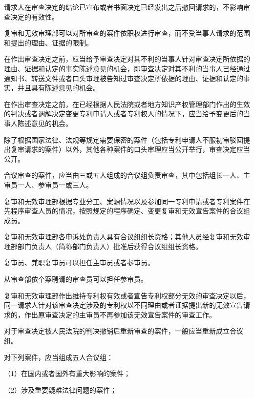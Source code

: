 请求人在审查决定的结论已宣布或者书面决定已经发出之后撤回请求的，不影响审查决定的有效性。

复审和无效审理部可以对所审查的案件依职权进行审查，而不受当事人请求的范围和提出的理由、证据的限制。

在作出审查决定之前，应当给予审查决定对其不利的当事人针对审查决定所依据的理由、证据和认定的事实陈述意见的机会，即审查决定对其不利的当事人已经通过通知书、转送文件或者口头审理被告知过审查决定所依据的理由、证据和认定的事实，并且具有陈述意见的机会。

在作出审查决定之前，在已经根据人民法院或者地方知识产权管理部门作出的生效的判决或者调解决定变更专利申请人或者专利权人的情况下，应当给予变更后的当事人陈述意见的机会。

除了根据国家法律、法规等规定需要保密的案件（包括专利申请人不服初审驳回提出复审请求的案件）以外，其他各种案件的口头审理应当公开举行，审查决定应当公开。

合议审查的案件，应当由三或五人组成的合议组负责审查，其中包括组长一人、主审员一人、参审员一或三人。

复审和无效审理部根据专业分工、案源情况以及参加同一专利申请或者专利案件在先程序审查人员的情况，按照规定的程序确定、变更复审和无效宣告案件的合议组成员。

复审和无效审理部各申诉处负责人具有合议组组长资格；其他人员经复审和无效审理部部门负责人（简称部门负责人）批准后获得合议组组长资格。

复审员、兼职复审员可以担任主审员或者参审员。

从审查部依个案聘请的审查员可以担任参审员。

复审和无效审理部作出维持专利权有效或者宣告专利权部分无效的审查决定以后，同一请求人针对该审查决定涉及的专利权以不同理由或者证据提出新的无效宣告请求的，作出原审查决定的主审员不再参加该无效宣告案件的审查工作。

对于审查决定被人民法院的判决撤销后重新审查的案件，一般应当重新成立合议组。

对下列案件，应当组成五人合议组：

{\setlength{\parindent}{17.1bp}（1）在国内或者国外有重大影响的案件；\par}

{\setlength{\parindent}{17.1bp}（2）涉及重要疑难法律问题的案件；\par}

